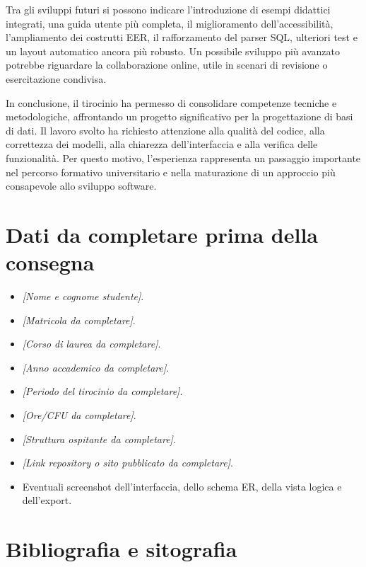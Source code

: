 \documentclass{unipd-thesis-modern}
\newcommand{\placeholder}[1]{\textit{[#1]}}
\begin{document}
Tra gli sviluppi futuri si possono indicare l'introduzione di esempi didattici integrati, una guida utente più completa, il miglioramento dell'accessibilità, l'ampliamento dei costrutti EER, il rafforzamento del parser SQL, ulteriori test e un layout automatico ancora più robusto. Un possibile sviluppo più avanzato potrebbe riguardare la collaborazione online, utile in scenari di revisione o esercitazione condivisa.

In conclusione, il tirocinio ha permesso di consolidare competenze tecniche e metodologiche, affrontando un progetto significativo per la progettazione di basi di dati. Il lavoro svolto ha richiesto attenzione alla qualità del codice, alla correttezza dei modelli, alla chiarezza dell'interfaccia e alla verifica delle funzionalità. Per questo motivo, l'esperienza rappresenta un passaggio importante nel percorso formativo universitario e nella maturazione di un approccio più consapevole allo sviluppo software.

\appendix
\chapter{Dati da completare prima della consegna}

\begin{itemize}
    \item \placeholder{Nome e cognome studente}.
    \item \placeholder{Matricola da completare}.
    \item \placeholder{Corso di laurea da completare}.
    \item \placeholder{Anno accademico da completare}.
    \item \placeholder{Periodo del tirocinio da completare}.
    \item \placeholder{Ore/CFU da completare}.
    \item \placeholder{Struttura ospitante da completare}.
    \item \placeholder{Link repository o sito pubblicato da completare}.
    \item Eventuali screenshot dell'interfaccia, dello schema ER, della vista logica e dell'export.
\end{itemize}

\cleardoublepage

\chapter*{Bibliografia e sitografia}
\end{document}
